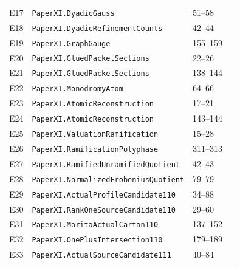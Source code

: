 \documentclass[10pt,oneside]{book}
\begin{document}
\begin{longtable}{@{}p{}p{}p{}p{}@{}}
E17&\nolinkurl{PaperXI.DyadicGauss}&51--58&\pageref{guide:E17}\\

E18&\nolinkurl{PaperXI.DyadicRefinementCounts}&42--44&\pageref{guide:E18}\\

E19&\nolinkurl{PaperXI.GraphGauge}&155--159&\pageref{guide:E19}\\

E20&\nolinkurl{PaperXI.GluedPacketSections}&22--26&\pageref{guide:E20}\\

E21&\nolinkurl{PaperXI.GluedPacketSections}&138--144&\pageref{guide:E21}\\

E22&\nolinkurl{PaperXI.MonodromyAtom}&64--66&\pageref{guide:E22}\\

E23&\nolinkurl{PaperXI.AtomicReconstruction}&17--21&\pageref{guide:E23}\\

E24&\nolinkurl{PaperXI.AtomicReconstruction}&143--144&\pageref{guide:E24}\\

E25&\nolinkurl{PaperXI.ValuationRamification}&15--28&\pageref{guide:E25}\\

E26&\nolinkurl{PaperXI.RamificationPolyphase}&311--313&\pageref{guide:E26}\\

E27&\nolinkurl{PaperXI.RamifiedUnramifiedQuotient}&42--43&\pageref{guide:E27}\\

E28&\nolinkurl{PaperXI.NormalizedFrobeniusQuotient}&79--79&\pageref{guide:E28}\\

E29&\nolinkurl{PaperXI.ActualProfileCandidate110}&34--88&\pageref{guide:E29}\\

E30&\nolinkurl{PaperXI.RankOneSourceCandidate110}&29--60&\pageref{guide:E30}\\

E31&\nolinkurl{PaperXI.MoritaActualCartan110}&137--152&\pageref{guide:E31}\\

E32&\nolinkurl{PaperXI.OnePlusIntersection110}&179--189&\pageref{guide:E32}\\

E33&\nolinkurl{PaperXI.ActualSourceCandidate111}&40--84&\pageref{guide:E33}\\


\end{longtable}
\end{document}

